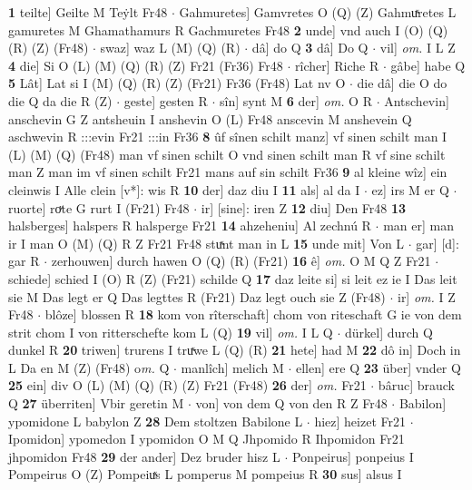 \documentclass[8pt,a4paper,notitlepage]{article}
\begin{document}
\begin{table}[ht]
\begin{minipage}[t]{0.5\linewidth}
\textbf{1} teilte] Geilte M Teẏlt Fr48  $\cdot$ Gahmuretes] Gamvretes O (Q) (Z) Gahmuͯretes L gamuretes M Ghamathamurs R Gachmuretes Fr48 \textbf{2} unde] vnd auch I (O) (Q) (R) (Z) (Fr48)  $\cdot$ swaz] waz L (M) (Q) (R)  $\cdot$ dâ] do Q \textbf{3} dâ] Do Q  $\cdot$ vil] \textit{om.} I L Z \textbf{4} die] Si O (L) (M) (Q) (R) (Z) Fr21 (Fr36) Fr48  $\cdot$ rîcher] Riche R  $\cdot$ gâbe] habe Q \textbf{5} Lât] Lat si I (M) (Q) (R) (Z) (Fr21) Fr36 (Fr48) Lat nv O  $\cdot$ die dâ] die O do die Q da die R (Z)  $\cdot$ geste] gesten R  $\cdot$ sîn] synt M \textbf{6} der] \textit{om.} O R  $\cdot$ Antschevin] anschevin G Z antsheuin I anshevin O (L) Fr48 anscevin M anshevein Q aschwevin R :::evin Fr21 :::in Fr36 \textbf{8} ûf sînen schilt manz] vf sinen schilt man I (L) (M) (Q) (Fr48) man vf sinen schilt O vnd sinen schilt man R vf sine schilt man Z man im vf sinen schilt Fr21 mans auf sin schilt Fr36 \textbf{9} al kleine wîz] ein cleinwis I Alle clein [v*]: wis R \textbf{10} der] daz diu I \textbf{11} als] al da I  $\cdot$ ez] irs M er Q  $\cdot$ ruorte] roͮte G rurt I (Fr21) Fr48  $\cdot$ ir] [sine]: iren Z \textbf{12} diu] Den Fr48 \textbf{13} halsberges] halspers R halsperge Fr21 \textbf{14} ahzeheniu] Al zechnú R  $\cdot$ man er] man ir I man O (M) (Q) R Z Fr21 Fr48 stuͯnt man in L \textbf{15} unde mit] Von L  $\cdot$ gar] [d]: gar R  $\cdot$ zerhouwen] durch hawen O (Q) (R) (Fr21) \textbf{16} ê] \textit{om.} O M Q Z Fr21  $\cdot$ schiede] schied I (O) R (Z) (Fr21) schilde Q \textbf{17} daz leite si] si leit ez ie I Das leit sie M Das legt er Q Das legttes R (Fr21) Daz legt ouch sie Z (Fr48)  $\cdot$ ir] \textit{om.} I Z Fr48  $\cdot$ blôze] blossen R \textbf{18} kom von rîterschaft] chom von riteschaft G ie von dem strit chom I von ritterschefte kom L (Q) \textbf{19} vil] \textit{om.} I L Q  $\cdot$ dürkel] durch Q dunkel R \textbf{20} triwen] trurens I truͯwe L (Q) (R) \textbf{21} hete] had M \textbf{22} dô in] Doch in L Da en M (Z) (Fr48) o\textit{m. } Q  $\cdot$ manlîch] melich M  $\cdot$ ellen] ere Q \textbf{23} über] vnder Q \textbf{25} ein] div O (L) (M) (Q) (R) (Z) Fr21 (Fr48) \textbf{26} der] \textit{om.} Fr21  $\cdot$ bâruc] brauck Q \textbf{27} überriten] Vbir geretin M  $\cdot$ von] von dem Q von den R Z Fr48  $\cdot$ Babilon] ypomidone L babylon Z \textbf{28} Dem stoltzen Babilone L  $\cdot$ hiez] heizet Fr21  $\cdot$ Ipomidon] ypomedon I ypomidon O M Q Jhpomido R Ihpomidon Fr21 jhpomidon Fr48 \textbf{29} der ander] Dez bruder hisz L  $\cdot$ Ponpeirus] ponpeius I Pompeirus O (Z) Pompeiuͯs L pomperus M pompeius R \textbf{30} sus] alsus I \newline

\end{minipage}
\end{table}
\end{document}
